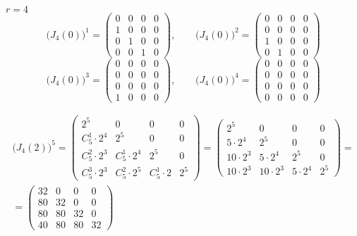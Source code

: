 \begin{eg}[1.]
	$ r = 4 $
	$$ \bigg( J_4(0) \bigg)^1 =
	\begin{pmatrix}
		0 & 0 & 0 & 0 \\
		1 & 0 & 0 & 0 \\
		0 & 1 & 0 & 0 \\
		0 & 0 & 1 & 0
	\end{pmatrix}, \qquad \bigg( J_4(0) \bigg)^2 =
	\begin{pmatrix}
		0 & 0 & 0 & 0 \\
		0 & 0 & 0 & 0 \\
		1 & 0 & 0 & 0 \\
		0 & 1 & 0 & 0
	\end{pmatrix} $$
	$$ \bigg( J_4(0) \bigg)^3 =
	\begin{pmatrix}
		0 & 0 & 0 & 0 \\
		0 & 0 & 0 & 0 \\
		0 & 0 & 0 & 0 \\
		1 & 0 & 0 & 0
	\end{pmatrix}, \qquad \bigg( J_4(0) \bigg)^4 =
	\begin{pmatrix}
		0 & 0 & 0 & 0 \\
		0 & 0 & 0 & 0 \\
		0 & 0 & 0 & 0 \\
		0 & 0 & 0 & 0
	\end{pmatrix} $$
\end{eg}

\begin{eg}[2.]
	\begin{multline*}
		\bigg( J_4(2) \bigg)^5 =
		\begin{pmatrix}
			2^5 & 0 & 0 & 0 \\
			C_5^1 \cdot 2^4 & 2^5 & 0 & 0 \\
			C_5^2 \cdot 2^3 & C_5^1 \cdot 2^4 & 2^5 & 0 \\
			C_5^3 \cdot 2^3 & C_5^2 \cdot 2^5 & C_5^1 \cdot 2 & 2^5
		\end{pmatrix} =
		\begin{pmatrix}
			2^5 & 0 & 0 & 0 \\
			5 \cdot 2^4 & 2^5 & 0 & 0 \\
			10 \cdot 2^3 & 5 \cdot 2^4 & 2^5 & 0 \\
			10 \cdot 2^3 & 10 \cdot 2^3 & 5 \cdot 2^4 & 2^5
		\end{pmatrix} = \\
		=
		\begin{pmatrix}
			32 & 0 & 0 & 0 \\
			80 & 32 & 0 & 0 \\
			80 & 80 & 32 & 0 \\
			40 & 80 & 80 & 32
		\end{pmatrix}
	\end{multline*}
\end{eg}

